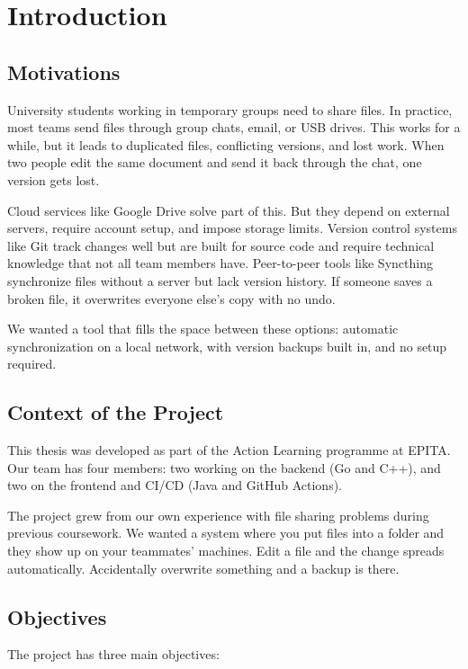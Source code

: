 \chapter{Introduction}

\section{Motivations}

University students working in temporary groups need to share files. In practice, most teams send files through group chats, email, or USB drives. This works for a while, but it leads to duplicated files, conflicting versions, and lost work. When two people edit the same document and send it back through the chat, one version gets lost.

Cloud services like Google Drive solve part of this. But they depend on external servers, require account setup, and impose storage limits. Version control systems like Git track changes well but are built for source code and require technical knowledge that not all team members have. Peer-to-peer tools like Syncthing synchronize files without a server but lack version history. If someone saves a broken file, it overwrites everyone else's copy with no undo.

We wanted a tool that fills the space between these options: automatic synchronization on a local network, with version backups built in, and no setup required.

\section{Context of the Project}

This thesis was developed as part of the Action Learning programme at EPITA. Our team has four members: two working on the backend (Go and C++), and two on the frontend and CI/CD (Java and GitHub Actions).

The project grew from our own experience with file sharing problems during previous coursework. We wanted a system where you put files into a folder and they show up on your teammates' machines. Edit a file and the change spreads automatically. Accidentally overwrite something and a backup is there.

\section{Objectives}

The project has three main objectives:

